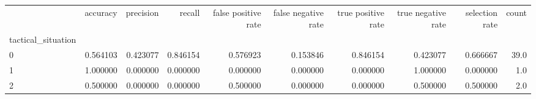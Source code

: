 \begin{tabular}{lrrrrrrrrr}
\toprule
{} &  accuracy &  precision &    recall &  false positive rate &  false negative rate &  true positive rate &  true negative rate &  selection rate &  count \\
tactical\_situation &           &            &           &                      &                      &                     &                     &                 &        \\
\midrule
0                  &  0.564103 &   0.423077 &  0.846154 &             0.576923 &             0.153846 &            0.846154 &            0.423077 &        0.666667 &   39.0 \\
1                  &  1.000000 &   0.000000 &  0.000000 &             0.000000 &             0.000000 &            0.000000 &            1.000000 &        0.000000 &    1.0 \\
2                  &  0.500000 &   0.000000 &  0.000000 &             0.500000 &             0.000000 &            0.000000 &            0.500000 &        0.500000 &    2.0 \\
\bottomrule
\end{tabular}
